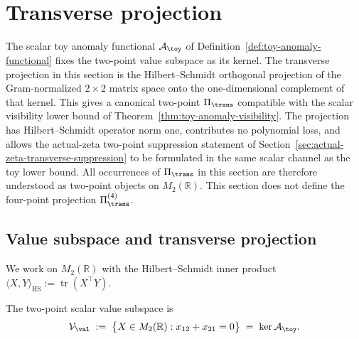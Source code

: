 
\section{Transverse projection}
\label{sec:transverse-projection}
\quad
{}\quad
{}\quad
{}\quad
{}\quad
{}
\par\medskip

The scalar toy anomaly functional \(\mathcal A_\toy\) of
Definition~\ref{def:toy-anomaly-functional} fixes the two-point value
subspace as its kernel.  The transverse projection in this section is
the Hilbert--Schmidt orthogonal projection of the Gram-normalized
\(2\times2\) matrix space onto the one-dimensional complement of that
kernel.  This gives a canonical two-point \(\Pi_\trans\) compatible
with the scalar visibility lower bound of
Theorem~\ref{thm:toy-anomaly-visibility}.  The projection has
Hilbert--Schmidt operator norm one, contributes no polynomial loss,
and allows the actual-zeta two-point suppression statement of
Section~\ref{sec:actual-zeta-transverse-suppression} to be formulated
in the same scalar channel as the toy lower bound.  All occurrences of
\(\Pi_\trans\) in this section are therefore understood as two-point
objects on \(M_2(\mathbb R)\).  This section does not define the
four-point projection \(\Pi_\trans^{(4)}\).

\subsection{Value subspace and transverse projection}
\label{subsec:transverse-projection-construction}

We work on \(M_{2}(\mathbb R)\) with the Hilbert--Schmidt inner product
\(
        \langle X,Y\rangle_{\mathrm{HS}}
        :=\operatorname{tr}(X^\top Y).
\)

\begin{definition}
\label{def:value-subspace}
The two-point scalar value subspace is
\begin{equation}
\label{eq:V-val}
        \mathcal V_\val
        \;:=\;\bigl\{X\in M_{2}(\mathbb R):x_{12}+x_{21}=0\bigr\}
        \;=\;\ker\mathcal A_\toy.
\end{equation}
\end{definition}

